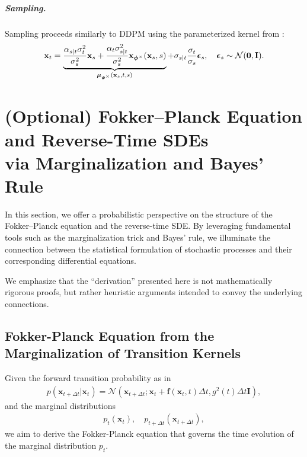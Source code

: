 
\subparagraph{Sampling.}  
Sampling proceeds similarly to DDPM using the parameterized kernel from :
\begin{align}\label{eq:general-ddpm-sampling-discrete}
    {\mathbf{x}}_t = \underbrace{\frac{\alpha_{s|t} \sigma_t^2}{\sigma_s^2} {\mathbf{x}}_s + \frac{\alpha_t \sigma_{s|t}^2}{\sigma_s^2} {\mathbf{x}}_{\bm{\phi}^\times}({\mathbf{x}}_s, s)}_{\bm{\mu}_{\bm{\phi}^\times}({\mathbf{x}}_s, t, s)} + \sigma_{s|t} \frac{\sigma_t}{\sigma_s} \bm{\epsilon}_s,\quad  \bm{\epsilon}_s \sim \mathcal{N}(\bm{0}, {\mathbf{I}}).
\end{align}



\clearpage
\newpage

\section{(Optional) Fokker–Planck Equation and Reverse-Time SDEs \\via Marginalization and Bayes’ Rule}\label{eq:heuristic-fpe-sde}
In this section, we offer a probabilistic perspective on the structure of the Fokker–Planck equation and the reverse-time SDE. By leveraging fundamental tools such as the marginalization trick and Bayes' rule, we illuminate the connection between the statistical formulation of stochastic processes and their corresponding differential equations.

We emphasize that the ``derivation'' presented here is not  mathematically rigorous proofs, but rather heuristic arguments intended to convey the underlying connections.


\subsection{Fokker-Planck Equation from the Marginalization of Transition Kernels}\label{subsec:fpe-reason}
Given the forward transition probability as in 
\begin{align*}
    p(\mathbf{x}_{t+\Delta t} | \mathbf{x}_t) = \mathcal{N}\left(\mathbf{x}_{t+\Delta t}; \mathbf{x}_t + \mathbf{f}(\mathbf{x}_t, t)\Delta t, g^2(t)\Delta t \mathbf{I}\right),
\end{align*}
and the marginal distributions
\begin{align*}
    p_t(\mathbf{x}_t), \quad p_{t+\Delta t}(\mathbf{x}_{t+\Delta t}),
\end{align*}
we aim to derive the Fokker-Planck equation that governs the time evolution of the marginal distribution $p_t$.


